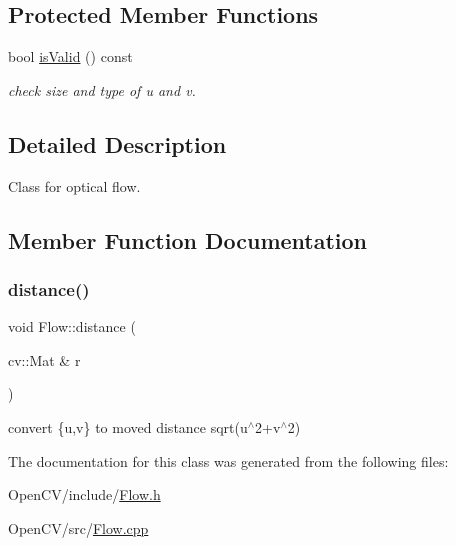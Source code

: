 \subsection*{Protected Member Functions}
\begin{DoxyCompactItemize}
\item 
\hypertarget{classskl_1_1_flow_a98eb935c6ac591992afcfa718ab44964}{}\label{classskl_1_1_flow_a98eb935c6ac591992afcfa718ab44964} 
bool \hyperlink{classskl_1_1_flow_a98eb935c6ac591992afcfa718ab44964}{is\+Valid} () const
\begin{DoxyCompactList}\small\item\em check size and type of u and v. \end{DoxyCompactList}\end{DoxyCompactItemize}


\subsection{Detailed Description}
Class for optical flow. 

\subsection{Member Function Documentation}
\hypertarget{classskl_1_1_flow_af771e593b403a1b807ec5564409188f1}{}\label{classskl_1_1_flow_af771e593b403a1b807ec5564409188f1} 
\subsubsection{\texorpdfstring{distance()}{distance()}}
{\footnotesize\ttfamily void Flow\+::distance (\begin{DoxyParamCaption}\item[{cv\+::\+Mat \&}]{r }\end{DoxyParamCaption})}

convert \{u,v\} to moved distance sqrt(u$^\wedge$2+v$^\wedge$2) 

The documentation for this class was generated from the following files\+:\begin{DoxyCompactItemize}
\item 
Open\+C\+V/include/\hyperlink{_flow_8h}{Flow.\+h}\item 
Open\+C\+V/src/\hyperlink{_flow_8cpp}{Flow.\+cpp}\end{DoxyCompactItemize}
